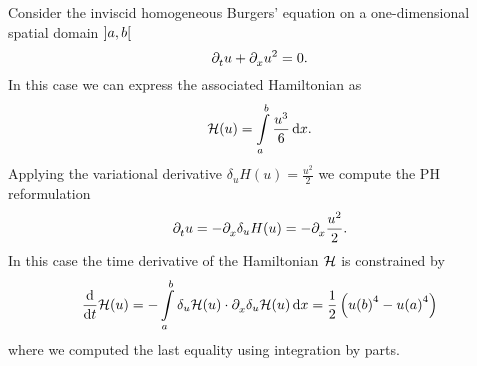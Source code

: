 \begin{example}\label{ex:burgers}
    Consider the inviscid homogeneous Burgers' equation on a one-dimensional spatial domain $\interval[open]{a}{b}$
    \begin{equation*}
        \pd[t]{} u + \pd[x]{} u^2 = 0.
    \end{equation*}
    In this case we can express the associated Hamiltonian as
    \begin{equation*}
        \mcl{H}(u) = \int\limits_a^b \frac{u^3}{6} \dif x.
    \end{equation*}
    Applying the variational derivative $\delta_u H(u) = \frac{u^2}{2}$ we compute the \ac{PH} reformulation
    \begin{equation*}
        \pd[t]{} u = - \pd{} \delta_u H(u) = -\pd{} \frac{u^2}{2}.
    \end{equation*}
    In this case the time derivative of the Hamiltonian $\mcl{H}$ is constrained by
    \begin{equation*}
        \frac{\dif}{\dif t} \mcl{H}(u) = - \int\limits_a^b \delta_u \mcl{H}(u) \cdot \pd{} \delta_u \mcl{H}(u) \dif x = \frac{1}{2} \left( {u(b)}^4 - {u(a)}^4 \right)
    \end{equation*}
    where we computed the last equality using integration by parts.
\end{example}

